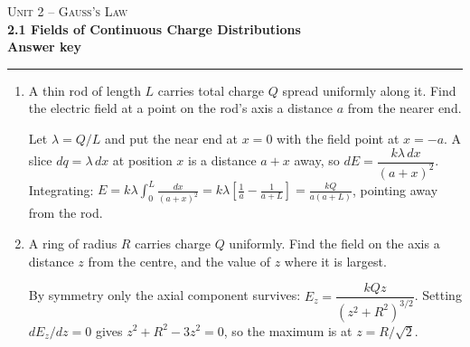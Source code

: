 \documentclass[11pt,letterpaper]{article}
\begin{document}
{\small\textsc{Unit 2 -- Gauss's Law}}\\[2pt]{\Large\bfseries 2.1 Fields of Continuous Charge Distributions}\\[8pt]\textbf{Answer key}\\[4pt]\hrule\vspace{10pt}{\small\itshape Placeholder worksheet for the site prototype. Free for classroom use.}\vspace{6pt}
\begin{enumerate}[leftmargin=*,itemsep=10pt]
\item A thin rod of length $L$ carries total charge $Q$ spread uniformly along it. Find the electric field at a point on the rod's axis a distance $a$ from the nearer end.
\begin{answer}Let $\lambda = Q/L$ and put the near end at $x=0$ with the field point at $x=-a$. A slice $dq = \lambda\,dx$ at position $x$ is a distance $a + x$ away, so $dE = \dfrac{k\lambda\,dx}{(a+x)^2}$. Integrating: $E = k\lambda\displaystyle\int_0^{L}\frac{dx}{(a+x)^2} = k\lambda\left[\frac{1}{a} - \frac{1}{a+L}\right] = \frac{kQ}{a(a+L)}$, pointing away from the rod.\end{answer}
\item A ring of radius $R$ carries charge $Q$ uniformly. Find the field on the axis a distance $z$ from the centre, and the value of $z$ where it is largest.
\begin{answer}By symmetry only the axial component survives: $E_z = \dfrac{kQz}{(z^2+R^2)^{3/2}}$. Setting $dE_z/dz = 0$ gives $z^2 + R^2 - 3z^2 = 0$, so the maximum is at $z = R/\sqrt{2}$.\end{answer}
\end{enumerate}
\end{document}
